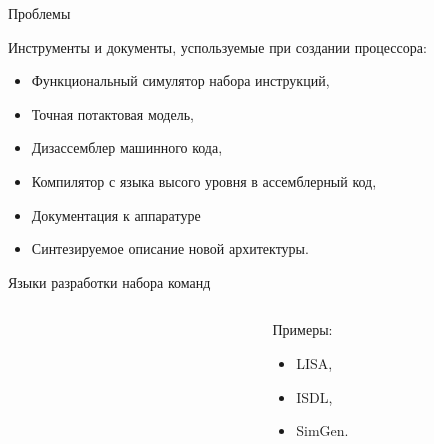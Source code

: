 \begin{frame}{Проблемы}

Инструменты и документы, успользуемые при создании процессора:

\begin{itemize}
    \item Функциональный симулятор набора инструкций,
    \item Точная потактовая модель,
    \item Дизассемблер машинного кода,
    \item Компилятор с языка высого уровня в ассемблерный код,
    \item Документация к аппаратуре
    \item Синтезируемое описание новой архитектуры.
\end{itemize}

\end{frame}

\begin{frame}{Языки разработки набора команд}

\begin{columns}[t]
    \begin{column}[T]{0.7\textwidth}
    \begin{figure}
        \centering
    \end{figure}
    \end{column}

    \begin{column}[T]{0.3\textwidth}
        Примеры:
        \begin{itemize}
            \item LISA,
            \item ISDL,
            \item SimGen.
        \end{itemize}
    \end{column}
\end{columns}

\end{frame}

